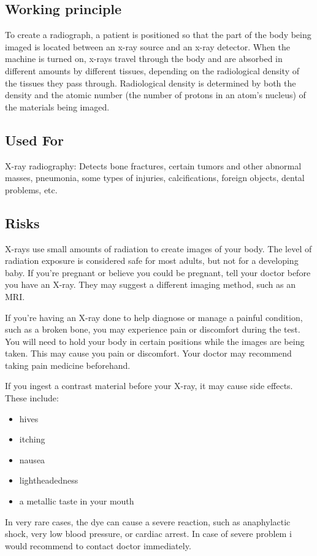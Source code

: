 \documentclass[12pt]{article}
\begin{document}
\subsection{Working principle}
To create a radiograph, a patient is positioned so that the part of the body being imaged is located between an x-ray source and an x-ray detector. When the machine is turned on, x-rays travel through the body and are absorbed in different amounts by different tissues, depending on the radiological density of the tissues they pass through. Radiological density is determined by both the density and the atomic number (the number of protons in an atom’s nucleus) of the materials being imaged.
\subsection{Used For}
X-ray radiography: Detects bone fractures, certain tumors and other abnormal masses, pneumonia, some types of injuries, calcifications, foreign objects, dental problems, etc.
\subsection{Risks}
X-rays use small amounts of radiation to create images of your body. The level of radiation exposure is considered safe for most adults, but not for a developing baby. If you’re pregnant or believe you could be pregnant, tell your doctor before you have an X-ray. They may suggest a different imaging method, such as an MRI.

If you’re having an X-ray done to help diagnose or manage a painful condition, such as a broken bone, you may experience pain or discomfort during the test. You will need to hold your body in certain positions while the images are being taken. This may cause you pain or discomfort. Your doctor may recommend taking pain medicine beforehand.

If you ingest a contrast material before your X-ray, it may cause side effects. These include:
\begin{itemize}
\item hives
\item itching
\item nausea
\item lightheadedness
\item a metallic taste in your mouth
\end{itemize}

In very rare cases, the dye can cause a severe reaction, such as anaphylactic shock, very low blood pressure, or cardiac arrest. In case of severe problem i would recommend to contact doctor immediately.
\end{document}

